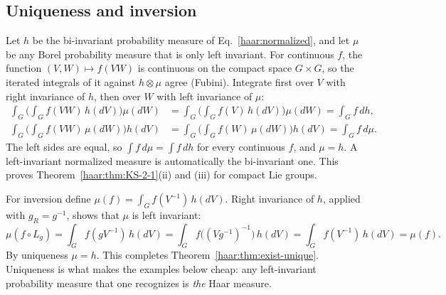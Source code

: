 \subsection{Uniqueness and inversion}
Let $h$ be the bi-invariant probability measure of
Eq.~\eqref{haar:normalized}, and let $\mu$ be any Borel probability measure
that is only left invariant. For continuous $f$, the function
$(V,W)\mapsto f(VW)$ is continuous on the compact space $G\times G$, so the
iterated integrals of it against $h\otimes\mu$ agree (Fubini). Integrate
first over $V$ with right invariance of $h$, then over $W$ with
left invariance of $\mu$:
\begin{align}
 \int_G\Big(\int_Gf(VW)\,h(dV)\Big)\mu(dW)
 &=\int_G\Big(\int_Gf(V)\,h(dV)\Big)\mu(dW)=\int_Gf\,dh,\\
 \int_G\Big(\int_Gf(VW)\,\mu(dW)\Big)h(dV)
 &=\int_G\Big(\int_Gf(W)\,\mu(dW)\Big)h(dV)=\int_Gf\,d\mu .
\end{align}
The left sides are equal, so $\int f\,d\mu=\int f\,dh$ for every continuous
$f$, and $\mu=h$. A left-invariant normalized measure is automatically the
bi-invariant one. This proves Theorem~\ref{haar:thm:KS-2-1}(ii) and (iii)
for compact Lie groups.

For inversion define $\mu(f)=\int_Gf(V^{-1})\,h(dV)$. Right invariance of
$h$, applied with $g_R=g^{-1}$, shows that $\mu$ is left invariant:
\begin{equation}\label{haar:inversion}
 \mu(f\circ L_g)=\int_Gf(gV^{-1})\,h(dV)
 =\int_Gf\big((Vg^{-1})^{-1}\big)\,h(dV)
 =\int_Gf(V^{-1})\,h(dV)=\mu(f).
\end{equation}
By uniqueness $\mu=h$. This completes Theorem~\ref{haar:thm:exist-unique}.
Uniqueness is what makes the examples below cheap: any left-invariant
probability measure that one recognizes is \emph{the} Haar measure.

